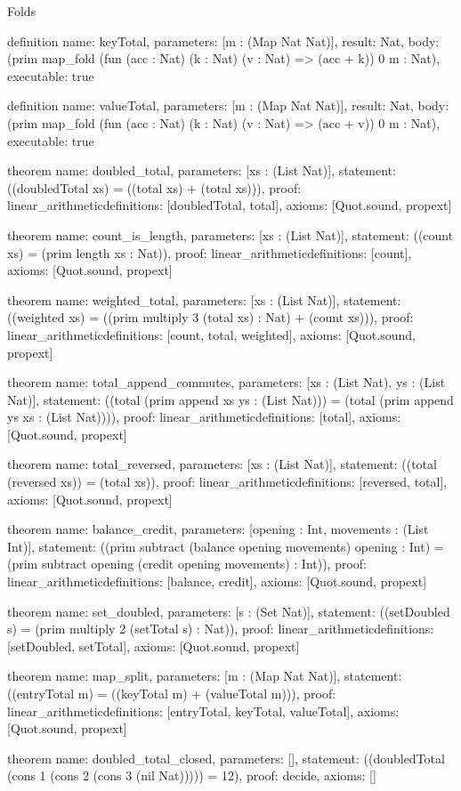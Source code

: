 \begin{lexlean}{Folds}
\begin{semanticmodule}
definition{
  name: keyTotal,
  parameters: [m : (Map Nat Nat)],
  result: Nat,
  body: (prim map_fold (fun (acc : Nat) (k : Nat) (v : Nat) => (acc + k)) 0 m : Nat),
  executable: true
}

definition{
  name: valueTotal,
  parameters: [m : (Map Nat Nat)],
  result: Nat,
  body: (prim map_fold (fun (acc : Nat) (k : Nat) (v : Nat) => (acc + v)) 0 m : Nat),
  executable: true
}

theorem{
  name: doubled_total,
  parameters: [xs : (List Nat)],
  statement: ((doubledTotal xs) = ((total xs) + (total xs))),
  proof: linear_arithmetic{definitions: [doubledTotal, total]},
  axioms: [Quot.sound, propext]
}

theorem{
  name: count_is_length,
  parameters: [xs : (List Nat)],
  statement: ((count xs) = (prim length xs : Nat)),
  proof: linear_arithmetic{definitions: [count]},
  axioms: [Quot.sound, propext]
}

theorem{
  name: weighted_total,
  parameters: [xs : (List Nat)],
  statement: ((weighted xs) = ((prim multiply 3 (total xs) : Nat) + (count xs))),
  proof: linear_arithmetic{definitions: [count, total, weighted]},
  axioms: [Quot.sound, propext]
}

theorem{
  name: total_append_commutes,
  parameters: [xs : (List Nat), ys : (List Nat)],
  statement: ((total (prim append xs ys : (List Nat))) = (total (prim append ys xs : (List Nat)))),
  proof: linear_arithmetic{definitions: [total]},
  axioms: [Quot.sound, propext]
}

theorem{
  name: total_reversed,
  parameters: [xs : (List Nat)],
  statement: ((total (reversed xs)) = (total xs)),
  proof: linear_arithmetic{definitions: [reversed, total]},
  axioms: [Quot.sound, propext]
}

theorem{
  name: balance_credit,
  parameters: [opening : Int, movements : (List Int)],
  statement: ((prim subtract (balance opening movements) opening : Int) = (prim subtract opening (credit opening movements) : Int)),
  proof: linear_arithmetic{definitions: [balance, credit]},
  axioms: [Quot.sound, propext]
}

theorem{
  name: set_doubled,
  parameters: [s : (Set Nat)],
  statement: ((setDoubled s) = (prim multiply 2 (setTotal s) : Nat)),
  proof: linear_arithmetic{definitions: [setDoubled, setTotal]},
  axioms: [Quot.sound, propext]
}

theorem{
  name: map_split,
  parameters: [m : (Map Nat Nat)],
  statement: ((entryTotal m) = ((keyTotal m) + (valueTotal m))),
  proof: linear_arithmetic{definitions: [entryTotal, keyTotal, valueTotal]},
  axioms: [Quot.sound, propext]
}

theorem{
  name: doubled_total_closed,
  parameters: [],
  statement: ((doubledTotal (cons 1 (cons 2 (cons 3 (nil Nat))))) = 12),
  proof: decide{},
  axioms: []
}
\end{semanticmodule}
\end{lexlean}
